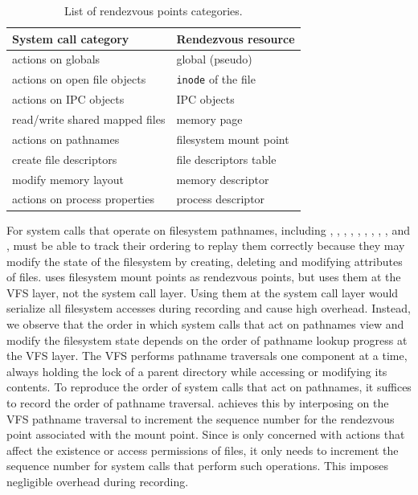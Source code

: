 \begin{table}[b]
\vskip -0.1in
\small
\begin{center}
\begin{tabular}{|l|l|}
  \hline\hline
  {\bf System call category} & {\bf Rendezvous resource} \\
  \hline
  actions on globals
    & global (pseudo) \\
  \hline
  actions on open file objects
    & {\tt inode} of the file \\
  \hline
  actions on IPC objects
    & IPC objects \\
  \hline
  read/write shared mapped files
    & memory page \\
  \hline
  actions on pathnames
    & filesystem mount point \\
  \hline
  create file descriptors
    & file descriptors table \\
  \hline
  modify memory layout
    & memory descriptor \\
  \hline
  actions on process properties
    & process descriptor \\
  \hline
  \hline
\end{tabular}
\end{center}
\vskip -5mm
\caption{List of rendezvous points categories.}
\label{scribe:tab:rendezvous}
\end{table}

For system calls that operate on filesystem pathnames, including
, , , , ,
, , , , and
, \scribe{} must be able to track their ordering to
replay them correctly because they may modify the state of the
filesystem by creating, deleting and modifying attributes of files.
\scribe{} uses filesystem mount points as rendezvous points, but uses
them at the VFS layer, not the system call
layer.  Using them at the system call layer would serialize
all filesystem accesses during recording and cause high overhead.
Instead, we observe that the order in which system calls that act 
on pathnames view and modify the filesystem state depends on
the order of pathname lookup progress at the 
VFS layer.  The VFS performs pathname traversals one component at a
time, always holding the lock of a parent directory while accessing or
modifying its contents.  To reproduce the order of system calls
that act on pathnames, it suffices to record the order of pathname 
traversal.  \scribe{} achieves this by interposing on the VFS pathname
traversal to increment the sequence number for the rendezvous point
associated with the mount point.  Since \scribe{} is only concerned
with actions that affect the existence or access permissions of files,
it only needs to increment the sequence number for system calls
that perform such operations.  This imposes negligible overhead during
recording.  

